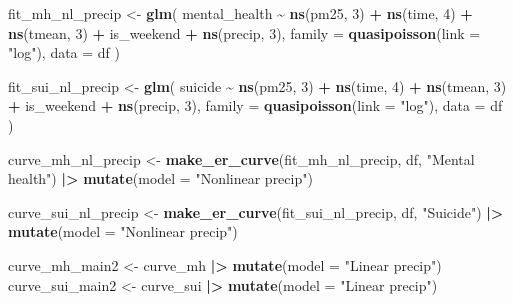 \documentclass[
]{article}
\newenvironment{Shaded}{\begin{snugshade}}{\end{snugshade}}
\newcommand{\AttributeTok}[1]{\textcolor[rgb]{0.13,0.29,0.53}{#1}}
\newcommand{\DecValTok}[1]{\textcolor[rgb]{0.00,0.00,0.81}{#1}}
\newcommand{\FunctionTok}[1]{\textcolor[rgb]{0.13,0.29,0.53}{\textbf{#1}}}
\newcommand{\NormalTok}[1]{#1}
\newcommand{\OtherTok}[1]{\textcolor[rgb]{0.56,0.35,0.01}{#1}}
\newcommand{\SpecialCharTok}[1]{\textcolor[rgb]{0.81,0.36,0.00}{\textbf{#1}}}
\newcommand{\StringTok}[1]{\textcolor[rgb]{0.31,0.60,0.02}{#1}}
\begin{document}
\begin{Shaded}
\begin{Highlighting}[]
\NormalTok{fit\_mh\_nl\_precip }\OtherTok{\textless{}{-}} \FunctionTok{glm}\NormalTok{(}
\NormalTok{  mental\_health }\SpecialCharTok{\textasciitilde{}} \FunctionTok{ns}\NormalTok{(pm25, }\DecValTok{3}\NormalTok{) }\SpecialCharTok{+} \FunctionTok{ns}\NormalTok{(time, }\DecValTok{4}\NormalTok{) }\SpecialCharTok{+} \FunctionTok{ns}\NormalTok{(tmean, }\DecValTok{3}\NormalTok{) }\SpecialCharTok{+}\NormalTok{ is\_weekend }\SpecialCharTok{+} \FunctionTok{ns}\NormalTok{(precip, }\DecValTok{3}\NormalTok{),}
  \AttributeTok{family =} \FunctionTok{quasipoisson}\NormalTok{(}\AttributeTok{link =} \StringTok{"log"}\NormalTok{),}
  \AttributeTok{data =}\NormalTok{ df}
\NormalTok{)}

\NormalTok{fit\_sui\_nl\_precip }\OtherTok{\textless{}{-}} \FunctionTok{glm}\NormalTok{(}
\NormalTok{  suicide }\SpecialCharTok{\textasciitilde{}} \FunctionTok{ns}\NormalTok{(pm25, }\DecValTok{3}\NormalTok{) }\SpecialCharTok{+} \FunctionTok{ns}\NormalTok{(time, }\DecValTok{4}\NormalTok{) }\SpecialCharTok{+} \FunctionTok{ns}\NormalTok{(tmean, }\DecValTok{3}\NormalTok{) }\SpecialCharTok{+}\NormalTok{ is\_weekend }\SpecialCharTok{+} \FunctionTok{ns}\NormalTok{(precip, }\DecValTok{3}\NormalTok{),}
  \AttributeTok{family =} \FunctionTok{quasipoisson}\NormalTok{(}\AttributeTok{link =} \StringTok{"log"}\NormalTok{),}
  \AttributeTok{data =}\NormalTok{ df}
\NormalTok{)}

\NormalTok{curve\_mh\_nl\_precip }\OtherTok{\textless{}{-}} \FunctionTok{make\_er\_curve}\NormalTok{(fit\_mh\_nl\_precip, df, }\StringTok{"Mental health"}\NormalTok{) }\SpecialCharTok{|\textgreater{}}
  \FunctionTok{mutate}\NormalTok{(}\AttributeTok{model =} \StringTok{"Nonlinear precip"}\NormalTok{)}

\NormalTok{curve\_sui\_nl\_precip }\OtherTok{\textless{}{-}} \FunctionTok{make\_er\_curve}\NormalTok{(fit\_sui\_nl\_precip, df, }\StringTok{"Suicide"}\NormalTok{) }\SpecialCharTok{|\textgreater{}}
  \FunctionTok{mutate}\NormalTok{(}\AttributeTok{model =} \StringTok{"Nonlinear precip"}\NormalTok{)}

\NormalTok{curve\_mh\_main2 }\OtherTok{\textless{}{-}}\NormalTok{ curve\_mh }\SpecialCharTok{|\textgreater{}} \FunctionTok{mutate}\NormalTok{(}\AttributeTok{model =} \StringTok{"Linear precip"}\NormalTok{)}
\NormalTok{curve\_sui\_main2 }\OtherTok{\textless{}{-}}\NormalTok{ curve\_sui }\SpecialCharTok{|\textgreater{}} \FunctionTok{mutate}\NormalTok{(}\AttributeTok{model =} \StringTok{"Linear precip"}\NormalTok{)}
\end{Highlighting}
\end{Shaded}
\end{document}
